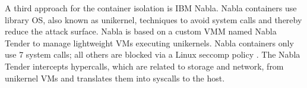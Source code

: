 A third approach for the container isolation is IBM Nabla. Nabla containers use library OS, also known as unikernel, techniques to avoid system calls and thereby reduce the attack surface. Nabla is based on a custom VMM named Nabla Tender to manage lightweight VMs executing unikernels. Nabla containers only use 7 system calls; all others are blocked via a Linux seccomp policy . The Nabla Tender intercepts hypercalls, which are related to storage and network, from unikernel VMs and translates them into syscalls to the host. \cite{Debab2021}\cite{Nabla}


